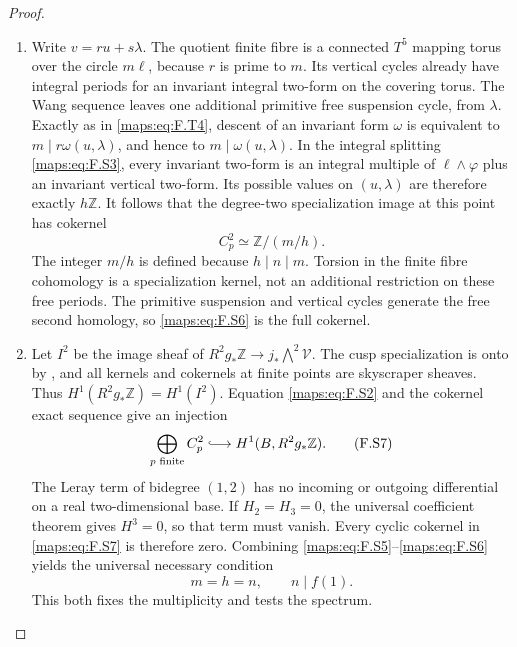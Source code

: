 \begin{proof}
\begin{enumerate}[label=\arabic*.]
\item Write $v=ru+s\lambda$.  The quotient finite fibre is a
connected $T^5$ mapping torus over the circle $m\ell$,
because $r$ is prime to $m$.
Its vertical cycles already have integral periods for an
invariant integral two-form on the covering torus.
The Wang sequence leaves one additional primitive free
suspension cycle, from $\lambda$.
Exactly as in \eqref{maps:eq:F.T4}, descent of an invariant form $\omega$
is equivalent to
$m\mid r\omega(u,\lambda)$, and hence to
$m\mid\omega(u,\lambda)$.
In the integral splitting \eqref{maps:eq:F.S3}, every invariant two-form
is an integral multiple of $\ell\wedge\varphi$ plus an
invariant vertical two-form.  Its possible values on
$(u,\lambda)$ are therefore exactly $h\mathbb Z$.
It follows that the degree-two specialization image at
this point has cokernel
\[
 C^2_p\simeq\mathbb Z/(m/h).
 \tag{F.S6}\label{maps:eq:F.S6}
\]
The integer $m/h$ is defined because $h\mid n\mid m$.
Torsion in the finite fibre cohomology is a specialization
kernel, not an additional restriction on these free periods.
The primitive suspension and vertical cycles generate the
free second homology, so \eqref{maps:eq:F.S6} is the full cokernel.

\item Let $I^2$ be the image sheaf of
$R^2g_*\mathbb Z\to j_*\bigwedge^2\mathcal V$.
The cusp specialization is onto by , and all kernels
and cokernels at finite points are skyscraper sheaves.
Thus $H^1(R^2g_*\mathbb Z)=H^1(I^2)$.
Equation \eqref{maps:eq:F.S2} and the cokernel exact sequence give an
injection
\[
 \bigoplus_{p\text{ finite}}C^2_p
           \lhook\joinrel\longrightarrow H^1(B,R^2g_*\mathbb Z).
 \tag{F.S7}\label{maps:eq:F.S7}
\]
The Leray term of bidegree $(1,2)$ has no incoming or
outgoing differential on a real two-dimensional base.
If $H_2=H_3=0$, the universal coefficient theorem gives
$H^3=0$, so that term must vanish.
Every cyclic cokernel in \eqref{maps:eq:F.S7} is therefore zero.
Combining \eqref{maps:eq:F.S5}--\eqref{maps:eq:F.S6} yields the universal necessary
condition
\[
 m=h=n,\qquad n\mid f(1).
 \tag{F.S8}\label{maps:eq:F.S8}
\]
This both fixes the multiplicity and tests the spectrum.


\end{enumerate}
\end{proof}
